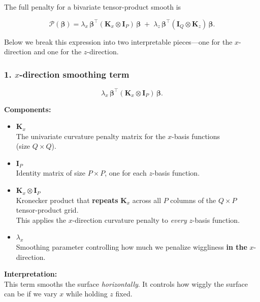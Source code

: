\documentclass[
  letterpaper,
  DIV=11,
  numbers=noendperiod]{scrreprt}
\begin{document}
The full penalty for a bivariate tensor-product smooth is

\[
\mathcal{P}(\boldsymbol{\beta}) =
\lambda_x\, \boldsymbol{\beta}^\top (\mathbf{K}_x \otimes \mathbf{I}_{P})\, \boldsymbol{\beta}
\;+\;
\lambda_z\, \boldsymbol{\beta}^\top (\mathbf{I}_{Q} \otimes \mathbf{K}_z)\, \boldsymbol{\beta}.
\]

Below we break this expression into two interpretable pieces---one for
the \(x\)-direction and one for the \(z\)-direction.

\hypertarget{x-direction-smoothing-term}{%
\subsubsection*{\texorpdfstring{\textbf{1.} \(x\)-direction smoothing
term}{1. x-direction smoothing term}}\label{x-direction-smoothing-term}}

\[
\lambda_x\, \boldsymbol{\beta}^\top (\mathbf{K}_x \otimes \mathbf{I}_{P})\, \boldsymbol{\beta}.
\]

\textbf{Components:}

\begin{itemize}
\item
  \(\mathbf{K}_x\)\\
  The univariate curvature penalty matrix for the \(x\)-basis
  functions\\
  (size \(Q \times Q\)).
\item
  \(\mathbf{I}_{P}\)\\
  Identity matrix of size \(P \times P\), one for each \(z\)-basis
  function.
\item
  \(\mathbf{K}_x \otimes \mathbf{I}_P\)\\
  Kronecker product that \textbf{repeats} \(\mathbf{K}_x\) across all
  \(P\) columns of the \(Q \times P\) tensor-product grid.\\
  This applies the \(x\)-direction curvature penalty to \emph{every}
  \(z\)-basis function.
\item
  \(\lambda_x\)\\
  Smoothing parameter controlling how much we penalize wiggliness
  \textbf{in the} \(x\)-direction.
\end{itemize}

\textbf{Interpretation:}\\
This term smooths the surface \emph{horizontally}. It controls how
wiggly the surface can be if we vary \(x\) while holding \(z\) fixed.
\end{document}
